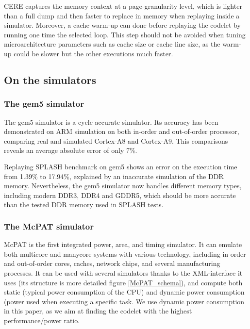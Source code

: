 \documentclass{article}
\begin{document}
\begin{multicols}{2}


CERE captures the memory context at a page-granularity level, which is lighter than a full dump and then faster to replace in memory when replaying inside a simulator. Moreover, a cache warm-up can done before replaying the codelet by running one time the selected loop. 
This step should not be avoided when tuning microarchitecture parameters such as cache size or cache line size, as the warm-up could be slower but the other executions much faster.


\subsection{On the simulators}
\subsubsection*{The gem5 simulator}
The gem5 simulator is a cycle-accurate simulator. Its accuracy has been demonstrated on ARM simulation on both in-order and out-of-order processor, comparing real and simulated Cortex-A8 and Cortex-A9\cite{DBLP:conf/samos/EndoCC14}. This comparisons reveals an average absolute error of only 7\%.

Replaying SPLASH benchmark on gem5 shows an error on the execution time from 1.39\% to 17.94\%, explained by an inaccurate simulation of the DDR memory. Nevertheless, the gem5 simulator now handles different memory types, including modern DDR3, DDR4 and GDDR5, which should be more accurate than the tested DDR memory used in SPLASH tests\cite{DBLP:conf/recosoc/ButkoGOS12}.


\subsubsection*{The McPAT simulator}
McPAT is the first integrated power, area, and timing simulator. It can emulate both multicore and manycore systems with various technology, including in-order and out-of-order cores, caches, network chips, and several manufacturing processes. It can be used with several simulators thanks to the XML-interface it uses (its structure is more detailed figure \ref{McPAT_schema}), and compute both static (typical power consumption of the CPU) and dynamic power consumption (power used when executing a specific task. We use dynamic power consumption in this paper, as we aim at finding the codelet with the highest performance/power ratio.


\end{multicols}
\end{document}
